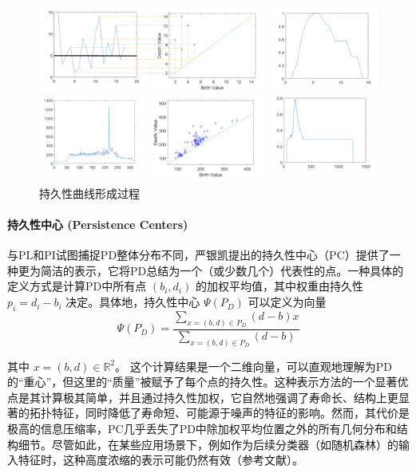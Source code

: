 \begin{figure}[htbp] %
    \centering %

    \includegraphics[width=1\textwidth]{figure/持久性曲线1.png} %

    \includegraphics[width=1\textwidth]{figure/持久性曲线2.png} %

    \caption{持久性曲线形成过程}
\end{figure}




\paragraph{持久性中心 (Persistence Centers)}
\label{sec:feat_pcen}
与PL和PI试图捕捉PD整体分布不同，严银凯提出的持久性中心（PC）提供了一种更为简洁的表示，它将PD总结为一个（或少数几个）代表性的点。一种具体的定义方式是计算PD中所有点 $(b_i, d_i)$ 的加权平均值，其中权重由持久性 $p_i = d_i - b_i$ 决定。具体地，持久性中心 $\Psi(P_D)$ 可以定义为向量
\begin{equation}
    \Psi(P_D) = \frac{\sum_{x=(b,d) \in P_D} (d-b) x}{\sum_{x=(b,d) \in P_D} (d-b)}
\end{equation}

其中 $x = (b, d) \in \mathbb{R}^2$。
这个计算结果是一个二维向量，可以直观地理解为PD的“重心”，但这里的“质量”被赋予了每个点的持久性。这种表示方法的一个显著优点是其计算极其简单，并且通过持久性加权，它自然地强调了寿命长、结构上更显著的拓扑特征，同时降低了寿命短、可能源于噪声的特征的影响。然而，其代价是极高的信息压缩率，PC几乎丢失了PD中除加权平均位置之外的所有几何分布和结构细节。尽管如此，在某些应用场景下，例如作为后续分类器（如随机森林）的输入特征时，这种高度浓缩的表示可能仍然有效（参考文献\cite{JSJC202406009}）。

